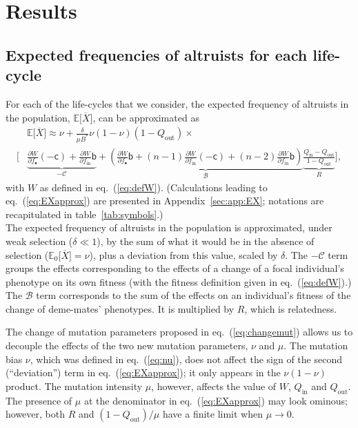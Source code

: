 \documentclass[11pt, letterpaper]{article}
\renewcommand{\eqref}[1]{\textup{{\normalfont eq.~(\ref{#1}}\normalfont)}}
\newcommand{\derivn}[2]{\frac{\partial #1}{\partial #2}}
\newcommand{\Esp}[1]{\mathbb{E}\big[ #1\big]}%
\newcommand{\Espzero}[1]{\mathbb{E}_0\big[ #1\big]}%
\newcommand{\appname}[0]{Appendix}
\newcommand{\bb}{\mathsf{b}}
\newcommand{\cc}{\mathsf{c}}
\newcommand{\mutbias}{\nu}
\newcommand{\inn}{\textrm{in}}
\newcommand{\out}{\textrm{out}}
\newcommand{\focal}{\bullet}
\newcommand{\Qin}{Q_{\inn}}
\newcommand{\Qout}{Q_{\out}}
\newcommand{\selstr}{\delta}
\begin{document}
\section*{Results}


\subsection*{Expected frequencies of altruists for each life-cycle}

For each of the life-cycles that we consider, the expected frequency of altruists in the population, $\Esp{\overline{X}}$, can be approximated as
\begin{equation}\label{eq:EXapprox}
\begin{split}
& \Esp{\overline{X}} \approx \mutbias + 
\frac{\selstr}{\mu B^*}  \mutbias (1-\mutbias) (1 - Q_{\out}) \times \\
 \Bigg[ &\underbrace{ \derivn{W}{f_{\focal}} (-\cc) + \derivn{W}{f_{\inn}} \bb}_{-\mathcal{C}} + \underbrace{ \left( \derivn{W}{f_{\focal}} \bb + (n-1) \derivn{W}{f_{\inn}} (-\cc) + (n-2) \derivn{W}{f_{\inn}} \bb \right) }_{\mathcal{B}} \underbrace{\frac{Q_{\inn} - Q_{\out}}{1 - Q_{\out}}}_{R} \Bigg],
\end{split}
\end{equation}
%
with $W$ as defined in \eqref{eq:defW}. (Calculations leading to \eqref{eq:EXapprox} are presented in  \appname~\ref{sec:app:EX}; notations are recapitulated in table~\ref{tab:symbols}.)\\ The expected frequency of altruists in the population is approximated, under weak selection ($\selstr \ll 1$), by the sum of what it would be in the absence of selection ($\Espzero{\overline{X}} =\mutbias$), plus a deviation from this value, scaled by $\selstr$. The $-\mathcal{C}$ term groups the effects corresponding to the effects of a change of a focal individual's phenotype on its own fitness (with the fitness definition given in \eqref{eq:defW}.) The $\mathcal{B}$ term corresponds to the sum of the effects on an individual's fitness of the change of deme-mates' phenotypes. It is multiplied by $R$, which is relatedness. 

The change of mutation parameters proposed in \eqref{eq:changemut} allows us to decouple the effects of the two new mutation parameters, $\mutbias$ and $\mu$. The mutation bias $\mutbias$, which was defined in \eqref{eq:nu}, does not affect the sign of the second (``deviation'') term in \eqref{eq:EXapprox}; it only appears in the $\mutbias (1-\mutbias)$ product. The mutation intensity $\mu$, however, affects the value of $W$, $\Qin$ and $\Qout$. The presence of $\mu$ at the denominator in \eqref{eq:EXapprox} may look ominous; however, both $R$ and $(1-\Qout)/\mu$ have a finite limit when $\mu \to 0$. 
\end{document}
